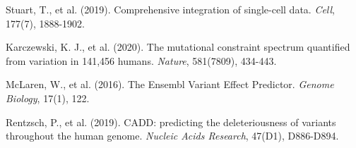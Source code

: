 \documentclass[12pt,a4paper]{article}
\begin{document}
\begin{thebibliography}{99}
Stuart, T., et al. (2019). Comprehensive integration of single-cell data. \textit{Cell}, 177(7), 1888-1902.

Karczewski, K. J., et al. (2020). The mutational constraint spectrum quantified from variation in 141,456 humans. \textit{Nature}, 581(7809), 434-443.

McLaren, W., et al. (2016). The Ensembl Variant Effect Predictor. \textit{Genome Biology}, 17(1), 122.

Rentzsch, P., et al. (2019). CADD: predicting the deleteriousness of variants throughout the human genome. \textit{Nucleic Acids Research}, 47(D1), D886-D894.

\end{thebibliography}
\end{document}
